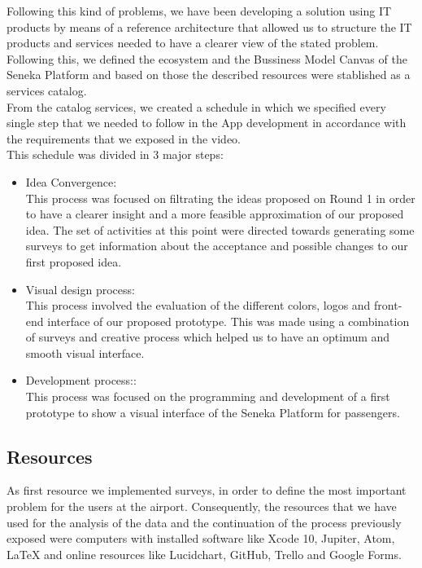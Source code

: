 \documentclass[]{article}
\begin{document}
Following this kind of problems, we have been developing a solution using IT products by means of a reference architecture that allowed us to structure the IT products and services needed to have a clearer view of the stated problem.\\

Following this, we defined the ecosystem and the Bussiness Model Canvas of the Seneka Platform and based on those the described resources were stablished as a services catalog.\\

From the catalog services, we created a schedule in which we specified every single step that we needed to follow in the App development in accordance with the requirements that we exposed in the video.\\

This schedule was divided in 3 major steps:
\begin{itemize}
\item Idea Convergence:\\
This process was focused on filtrating the ideas proposed on Round 1 in order to have a clearer insight and a more feasible approximation of our proposed idea. The set of activities at this point were directed towards generating some surveys to get information about the acceptance and possible changes to our first proposed idea.
\item Visual design process:\\
This process involved the evaluation of the different colors, logos and front-end interface of our proposed prototype. This was made using a combination of surveys and creative process which helped us to have an optimum and smooth visual interface.
\item Development process::\\
This process was focused on the programming and development of a first prototype to show a visual interface of the Seneka Platform for passengers.

\end{itemize}


\subsection{Resources}

As first resource we implemented surveys, in order to define the most important problem for the users at the airport. Consequently,  the resources that we have used for the analysis of the data and the continuation of the process previously exposed were computers with installed software like Xcode 10, Jupiter, Atom, LaTeX and online resources like Lucidchart, GitHub, Trello and Google Forms.\\  
\end{document}
